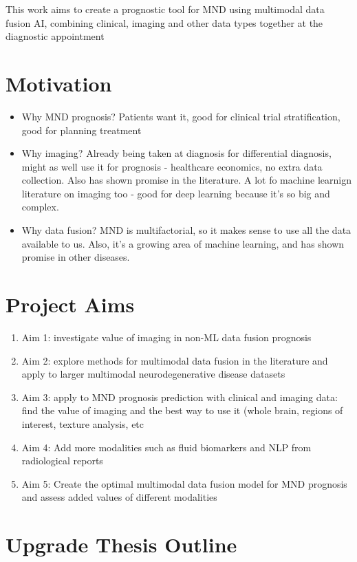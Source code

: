 This work aims to create a prognostic tool for MND using multimodal data fusion AI, combining clinical, imaging and other data types together at the diagnostic appointment


\section{Motivation}

\begin{itemize}
    \item Why MND prognosis? Patients want it, good for clinical trial stratification, good for planning treatment
    \item Why imaging? Already being taken at diagnosis for differential diagnosis, might as well use it for prognosis - healthcare economics, no extra data collection. Also has shown promise in the literature. A lot fo machine learnign literature on imaging too - good for deep learning because it's so big and complex.
    \item Why data fusion? MND is multifactorial, so it makes sense to use all the data available to us. Also, it's a growing area of machine learning, and has shown promise in other diseases.
\end{itemize}

\section{Project Aims}

\begin{enumerate}
    \item Aim 1: investigate value of imaging in non-ML data fusion prognosis
    \item Aim 2: explore methods for multimodal data fusion in the literature and apply to larger multimodal neurodegenerative disease datasets
    \item Aim 3: apply to MND prognosis prediction with clinical and imaging data: find the value of imaging and the best way to use it (whole brain, regions of interest, texture analysis, etc
    \item Aim 4: Add more modalities such as fluid biomarkers and NLP from radiological reports
    \item Aim 5: Create the optimal multimodal data fusion model for MND prognosis and assess added values of different modalities
\end{enumerate}

\section{Upgrade Thesis Outline}